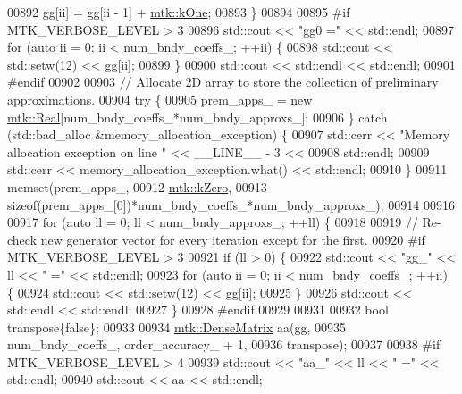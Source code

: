 \begin{DoxyCode}
{{00892     gg[ii] = gg[ii - 1] + \hyperlink{group__c01-roots_ga26407c24d43b6b95480943340d285c71}{mtk::kOne};
00893   \}
00894 
00895 \textcolor{preprocessor}{  #if MTK\_VERBOSE\_LEVEL > 3}
00896   std::cout << \textcolor{stringliteral}{"gg0 ="} << std::endl;
00897   \textcolor{keywordflow}{for} (\textcolor{keyword}{auto} ii = 0; ii < num\_bndy\_coeffs\_; ++ii) \{
00898     std::cout << std::setw(12) << gg[ii];
00899   \}
00900   std::cout << std::endl << std::endl;
00901 \textcolor{preprocessor}{  #endif}
00902 
00903   \textcolor{comment}{// Allocate 2D array to store the collection of preliminary approximations.}
00904   \textcolor{keywordflow}{try} \{
00905     prem\_apps\_ = \textcolor{keyword}{new} \hyperlink{group__c01-roots_gac080bbbf5cbb5502c9f00405f894857d}{mtk::Real}[num\_bndy\_coeffs\_*num\_bndy\_approxs\_];
00906   \} \textcolor{keywordflow}{catch} (std::bad\_alloc &memory\_allocation\_exception) \{
00907     std::cerr << \textcolor{stringliteral}{"Memory allocation exception on line "} << \_\_LINE\_\_ - 3 <<
00908 std::endl;
00909     std::cerr << memory\_allocation\_exception.what() << std::endl;
00910   \}
00911   memset(prem\_apps\_,
00912          \hyperlink{group__c01-roots_ga59a451a5fae30d59649bcda274fea271}{mtk::kZero},
00913          \textcolor{keyword}{sizeof}(prem\_apps\_[0])*num\_bndy\_coeffs\_*num\_bndy\_approxs\_);
00914 
00916 
00917   \textcolor{keywordflow}{for} (\textcolor{keyword}{auto} ll = 0; ll < num\_bndy\_approxs\_; ++ll) \{
00918 
00919     \textcolor{comment}{// Re-check new generator vector for every iteration except for the first.}
00920 \textcolor{preprocessor}{    #if MTK\_VERBOSE\_LEVEL > 3}
00921     \textcolor{keywordflow}{if} (ll > 0) \{
00922       std::cout << \textcolor{stringliteral}{"gg\_"} << ll << \textcolor{stringliteral}{" ="} << std::endl;
00923       \textcolor{keywordflow}{for} (\textcolor{keyword}{auto} ii = 0; ii < num\_bndy\_coeffs\_; ++ii) \{
00924         std::cout << std::setw(12) << gg[ii];
00925       \}
00926       std::cout << std::endl << std::endl;
00927     \}
00928 \textcolor{preprocessor}{    #endif}
00929 
00931 
00932     \textcolor{keywordtype}{bool} transpose\{\textcolor{keyword}{false}\};
00933 
00934     \hyperlink{classmtk_1_1DenseMatrix}{mtk::DenseMatrix} aa(gg,
00935                          num\_bndy\_coeffs\_, order\_accuracy\_ + 1,
00936                          transpose);
00937 
00938 \textcolor{preprocessor}{    #if MTK\_VERBOSE\_LEVEL > 4}
00939     std::cout << \textcolor{stringliteral}{"aa\_"} << ll << \textcolor{stringliteral}{" ="} << std::endl;
00940     std::cout << aa << std::endl;
}}
\end{DoxyCode}
